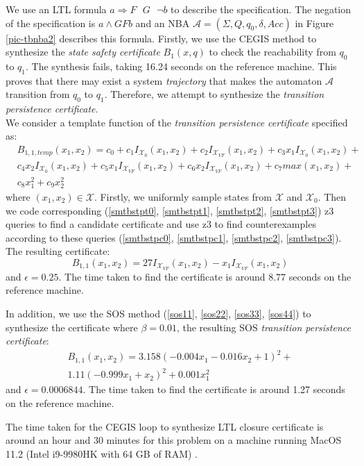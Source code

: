 \documentclass[acmlarge]{acmart}
\begin{document}
We use an LTL formula $a \Longrightarrow F\text{ }G\text{ }\lnot b$ to describe the specification. The negation of the specification is $a \land G F b$ and an NBA $\mathcal{A} = (\Sigma, Q, q_0, \delta, Acc)$ in Figure \ref{pic-tbnba2} describes this formula. Firstly, we use the CEGIS method to synthesize the \emph{state safety certificate} $B_1(x, q)$ to check the reachability from $q_0$ to $q_1$. The synthesis fails, taking 16.24 seconds on the reference machine. This proves that there may exist a system \emph{trajectory} that makes the automaton $\mathcal{A}$ transition from $q_0$ to $q_1$. Therefore, we attempt to synthesize the \emph{transition persistence certificate}.\\
We consider a template function of the \emph{transition persistence certificate} specified as:
\begin{align*}
  & B_{1, 1, temp}(x_1, x_2) = c_0 + c_1 I_{\mathcal{X}_0}(x_1, x_2) + c_2 I_{\mathcal{X}_{VF}}(x_1, x_2) + c_3 x_1 I_{\mathcal{X}_0}(x_1, x_2) + \\
  & c_4 x_2 I_{\mathcal{X}_0}(x_1, x_2) + c_5 x_1 I_{\mathcal{X}_{VF}}(x_1, x_2) + c_6 x_2 I_{\mathcal{X}_{VF}}(x_1, x_2) + c_7 max(x_1, x_2) + \\
  & c_8 x_1^2 + c_9 x_2^2
\end{align*}
where $(x_1, x_2) \in \mathcal{X}$. Firstly, we uniformly sample states from $\mathcal{X}$ and $\mathcal{X}_0$. Then we code corresponding (\ref{smtbstpt0}, \ref{smtbstpt1}, \ref{smtbstpt2}, \ref{smtbstpt3}) z3 queries to find a candidate certificate and use z3 to find counterexamples according to these queries (\ref{smtbstpc0}, \ref{smtbstpc1}, \ref{smtbstpc2}, \ref{smtbstpc3}). The resulting certificate: $$B_{1, 1}(x_1, x_2) = 27 I_{\mathcal{X}_{VF}}(x_1, x_2)- x_1 I_{\mathcal{X}_{VF}}(x_1, x_2)$$ and $\epsilon=0.25$. The time taken to find the certificate is around 8.77 seconds on the reference machine.

In addition, we use the SOS method (\ref{sos11}, \ref{sos22}, \ref{sos33}, \ref{sos44}) to synthesize the certificate where $\beta=0.01$, the resulting SOS \emph{transition persistence certificate}:
\begin{align*}
  B_{1, 1}(x_1, x_2) = 3.158 (-0.004 x_1 - 0.016 x_2 + 1)^2 + \\
  1.11 (-0.999 x_1 + x_2)^2 + 0.001 x_1^2  
\end{align*}
and $\epsilon = 0.0006844$. The time taken to find the certificate is around 1.27 seconds on the reference machine.

The time taken for the CEGIS loop to synthesize LTL closure certificate is around an hour and 30 minutes for this problem on a machine running MacOS 11.2 (Intel i9-9980HK with 64 GB of RAM) \cite{murali2024closure}.
\end{document}
